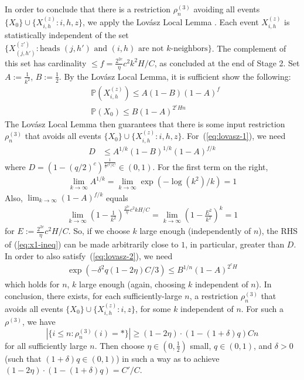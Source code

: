 \documentclass[11pt,a4paper]{article}
\newcommand{\Prob}{\mathbb{P}}%
\begin{document}
In order to conclude that there is a restriction $\rho^{(3)}_n$ avoiding all events $\{X_0\} \cup \{X_{i,h}^{(z)} : i, h, z\}$, we apply the Lov{\'a}sz Local Lemma \cite[Theorem 6.17]{mitzenmacherprobability}.
Each event $X_{i,h}^{(z)}$ is statistically independent of the set $\{X_{(j,h')}^{(z')} : \text{heads } {(j,h')} \text{ and } {(i,h)} \text{ are not $k$-neighbors}\}$.
The complement of this set has cardinality $\leq f= \frac{2^{2c}}{\eta}c^2k^2H/C$, as concluded at the end of Stage 2.
Set $A:=\frac{1}{k^2}$, $B:=\frac{1}{2}$.
By the Lov{\'a}sz Local Lemma, it is sufficient show the following: %
\begin{align}\label{eq:lovasz-1}
&\Prob(X_{i,h}^{(z)}) \leq A(1-B)(1-A)^{f} \\ \label{eq:lovasz-2}
&\Prob(X_0)  \leq B (1-A)^{2^cHn}
\end{align}
The Lov{\'a}sz Local Lemma then guarantees that there is some input restriction $\rho^{(3)}_n$ that avoids all events $\{X_0\} \cup \{X_{i,h}^{(z)} : i, h, z\}$.
For~(\ref{eq:lovasz-1}), we need
\begin{align}\label{eq:x1-ineq}
    D &\leq A^{1/k}(1-B)^{1/k}(1-A)^{f/k} 
\end{align}
where $D =  \left(1-(q/2)^c\right)^{\frac{1}{\frac{1}{\eta}c^2/C}} \in (0,1)$.
For the first term on the right, 
\begin{align*}
\lim_{k\rightarrow \infty} A^{1/k} = \lim_{k\rightarrow \infty} \exp\left(-\log(k^2) / k\right) = 1
\end{align*}
Also, $\lim_{k\rightarrow \infty} (1-A)^{f/k}$ equals
\begin{align*}
\lim_{k\rightarrow \infty} \left(1-\frac{1}{k^2}\right)^{\frac{2^{2c}}{\eta}c^2kH/C} = \lim_{k\rightarrow \infty} \left(1-\frac{E^2}{k^2}\right)^{k} = 1
\end{align*}
for $E := \frac{2^{2c}}{\eta}c^2H/C$. So, if we choose $k$ large enough (independently of $n$), the RHS of (\ref{eq:x1-ineq}) can be made arbitrarily close to $1$, in particular, greater than $D$.
In order to also satisfy~(\ref{eq:lovasz-2}), we need
\begin{align*}
\exp\left(-\delta^2q(1-2\eta)C/3\right)  \leq B^{1/n} (1-A)^{2^c H}
\end{align*}
which holds for $n$, $k$ large enough (again, choosing $k$ independent of $n$). 
In conclusion, there exists, for each sufficiently-large $n$, a restriction $\rho^{(3)}_n$ that avoids all events $\{X_0\} \cup \{X_{i,h}^{(z)} : i, z\}$, for some $k$ independent of $n$.
For such a $\rho^{(3)}$, we have
\begin{equation*}
|\{i \leq n: \rho^{(3)}_n(i) = *\}|\geq (1-2\eta)\cdot (1-(1+\delta)q) C n
\end{equation*}
for all sufficiently large $n$.
Then choose $\eta \in (0,\frac{1}{2})$ small, $q \in (0,1)$, and $\delta >0$ (such that $(1+\delta)q \in (0,1)$) in such a way as to achieve $(1-2\eta)\cdot (1-(1+\delta)q) = C'/C$.
\end{document}
